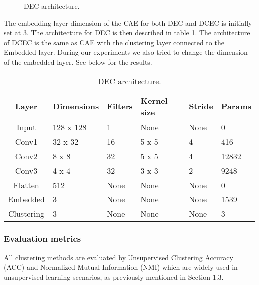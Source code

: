\begin{figure}[H]
    \centering
    
    \caption{DEC architecture.}
\end{figure}

The embedding layer dimension of the CAE for both DEC and DCEC is initially set at 3. The architecture for DEC is then described in table \ref{table_DEC}. The architecture of DCEC is the same as CAE with the clustering layer connected to the Embedded layer. During our experiments we also tried to change the dimension of the embedded layer. See below for the results.

\begin{table}[H]
    \centering
    \begin{tabular}{clllll} \hline
        \textbf{Layer} & \textbf{Dimensions} & \textbf{Filters} & \textbf{Kernel size} & \textbf{Stride} & \textbf{Params} \\ \hline
        Input      & 128 x 128  & 1       & None        & None   & 0                \\ \hline
        Conv1      & 32 x 32    & 16      & 5 x 5       & 4      & 416              \\ \hline
        Conv2      & 8 x 8      & 32      & 5 x 5       & 4      & 12832            \\ \hline
        Conv3      & 4 x 4      & 32      & 3 x 3       & 2      & 9248             \\ \hline
        Flatten    & 512        & None    & None        & None   & 0                \\ \hline
        Embedded   & 3          & None    & None        & None   & 1539             \\ \hline
        Clustering & 3          & None    & None        & None   & 3                \\ \hline
    \end{tabular}
    \caption{DEC architecture.}
    \label{table_DEC}
\end{table}

\subsubsection{Evaluation metrics}

All clustering methods are evaluated by Unsupervised Clustering Accuracy (ACC) and Normalized Mutual Information (NMI) which are widely used in unsupervised learning scenarios, as previously mentioned in Section 1.3. 

